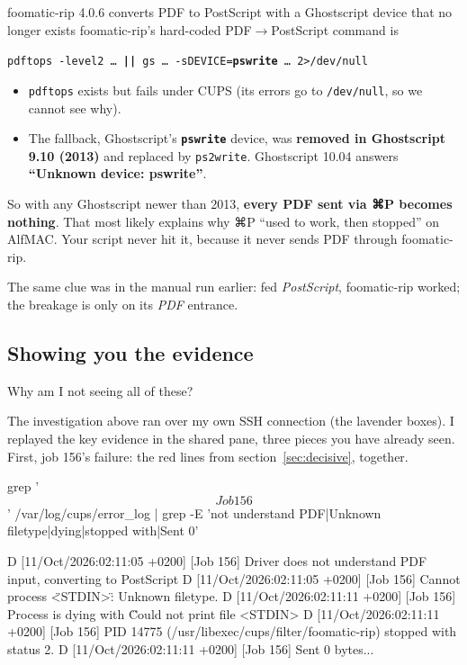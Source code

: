 \documentclass[11pt,a4paper]{article}
\begin{document}
\begin{culprit}{foomatic-rip 4.0.6 converts PDF to PostScript with a Ghostscript device that no longer exists}
foomatic-rip's hard-coded PDF$\to$PostScript command is
\begin{center}\texttt{pdftops -level2 \dots\ \textbf{||} gs \dots\ -sDEVICE=\textbf{pswrite} \dots\ 2>/dev/null}\end{center}
\begin{itemize}[nosep]
  \item \texttt{pdftops} exists but fails under CUPS (its errors go to \texttt{/dev/null}, so we cannot see why).
  \item The fallback, Ghostscript's \textbf{\texttt{pswrite}} device, was \textbf{removed in Ghostscript 9.10 (2013)} and replaced by \texttt{ps2write}. Ghostscript 10.04 answers \textbf{``Unknown device: pswrite''}.
\end{itemize}
So with any Ghostscript newer than 2013, \textbf{every PDF sent via ⌘P becomes nothing}. That most likely explains why ⌘P ``used to work, then stopped'' on AlfMAC. Your script never hit it, because it never sends PDF through foomatic-rip.
\end{culprit}

The same clue was in the manual run earlier: fed \emph{PostScript}, foomatic-rip worked; the breakage is only on its \emph{PDF} entrance.

\subsection{Showing you the evidence}

\begin{alf}
Why am I not seeing all of these?
\end{alf}

The investigation above ran over my own SSH connection (the lavender boxes). I replayed the key evidence in the shared pane, three pieces you have already seen. First, job 156's failure: the red lines from section~\ref{sec:decisive}, together.

\begin{pane}
grep '\[Job 156\]' /var/log/cups/error_log | grep -E 'not understand PDF|Unknown filetype|dying|stopped with|Sent 0'
\end{pane}
\begin{cmdout}
D [11/Oct/2026:02:11:05 +0200] [Job 156] Driver does not understand PDF input, converting to PostScript
D [11/Oct/2026:02:11:05 +0200] [Job 156] Cannot process \"<STDIN>\": Unknown filetype.
D [11/Oct/2026:02:11:11 +0200] [Job 156] Process is dying with \"Could not print file <STDIN>
D [11/Oct/2026:02:11:11 +0200] [Job 156] PID 14775 (/usr/libexec/cups/filter/foomatic-rip) stopped with
status 2.
D [11/Oct/2026:02:11:11 +0200] [Job 156] Sent 0 bytes...
\end{cmdout}
\end{document}
